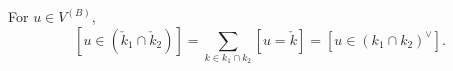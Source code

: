 For $u \in V^{(B)}$,
$$[u \in (\check{k}_1 \cap \check{k}_2)] = \sum_{k \in k_1 \cap k_2} [u = \check{k}] = [u \in (k_1 \cap k_2)^{\vee}].$$
